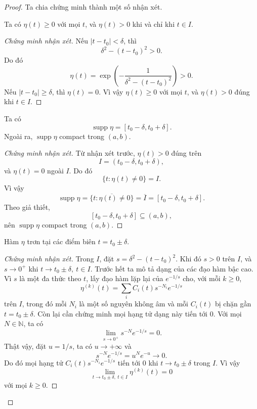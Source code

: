 ﻿\documentclass[12pt]{article}
\begin{document}
\begin{proof}
Ta chia chứng minh thành một số nhận xét.

\begin{claim}\label{C.4}
Ta có $\eta(t) \geq 0$ với mọi $t$, và $\eta(t) > 0$ khi và chỉ khi $t \in I$.
\end{claim}

\begin{proof}[Chứng minh nhận xét]
Nếu $|t - t_0| < \delta$, thì
\[
 \delta^2 - (t - t_0)^2 > 0.
\]
Do đó
\[
 \eta(t)
 =
 \exp\left(-\frac{1}{\delta^2 - (t - t_0)^2}\right) > 0.
\]
Nếu $|t - t_0| \geq \delta$, thì $\eta(t) = 0$. Vì vậy $\eta(t) \geq 0$ với mọi $t$, và $\eta(t) > 0$ đúng khi $t \in I$.
\end{proof}

\begin{claim}\label{C.5}
Ta có 
\[
 \operatorname{supp}\eta = [t_0 - \delta, t_0 + \delta].
\]
Ngoài ra, $\operatorname{supp}\eta$ compact trong $(a, b)$.
\end{claim}

\begin{proof}[Chứng minh nhận xét]
Từ nhận xét trước, $\eta(t) > 0$ đúng trên
\[
 I = (t_0 - \delta, t_0 + \delta),
\]
và $\eta(t) = 0$ ngoài $I$. Do đó
\[
 \{t:\eta(t) \neq 0\} = I.
\]
Vì vậy
\[
 \operatorname{supp}\eta
 =
 \overline{\{t:\eta(t) \neq 0\}}
 =
 \overline I
 =
 [t_0 - \delta, t_0 + \delta].
\]
Theo giả thiết,
\[
 [t_0 - \delta, t_0 + \delta] \subseteq(a, b),
\]
nên $\operatorname{supp}\eta$ compact trong $(a, b)$.
\end{proof}
\begin{claim}\label{C.6}
Hàm $\eta$ trơn tại các điểm biên $t = t_0 \pm \delta$.
\end{claim}
\begin{proof}[Chứng minh nhận xét]
Trong $I$, đặt
$
 s = \delta^2 - (t - t_0)^2.
$
Khi đó $s > 0$ trên $I$, và $s \to 0^+$ khi $t \to t_0 \pm \delta,\ t \in I$.
Trước hết ta mô tả dạng của các đạo hàm bậc cao. Vì $s$ là một đa thức theo $t$, lấy đạo hàm lặp lại của $e^{-1/s}$ cho, với mỗi $k \geq 0$,
\[
 \eta^{(k)}(t)
 =
 \sum_i C_i(t)s^{-N_i}e^{-1/s}
\]
trên $I$, trong đó mỗi $N_i$ là một số nguyên không âm và mỗi $C_i(t)$ bị chặn gần $t = t_0 \pm \delta$.
Còn lại cần chứng minh mọi hạng tử dạng này tiến tới $0$. Với mọi $N \in \mathbb N$, ta có
\[
 \lim_{s \to 0^+}s^{-N}e^{-1/s} = 0.
\]
Thật vậy, đặt $u = 1/s$, ta có $u \to + \infty$ và
\[
 s^{-N}e^{-1/s} = u^Ne^{-u} \to 0.
\]
Do đó mọi hạng tử $C_i(t)s^{-N_i}e^{-1/s}$ tiến tới $0$ khi $t \to t_0 \pm \delta$ trong $I$. Vì vậy
\[
 \lim_{t \to t_0 \pm \delta,\ t \in I}\eta^{(k)}(t) = 0
\]
với mọi $k \geq 0$.


\end{proof}
\end{proof}
\end{document}
